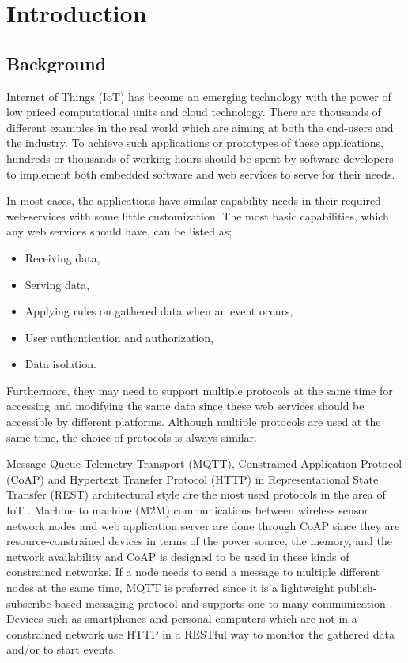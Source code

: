 
\chapter{Introduction}\label{chapter:introduction}

\section{Background}
Internet of Things (IoT) has become an emerging technology with the power of low priced computational units and cloud technology. There are thousands of different examples in the real world which are aiming at both the end-users and the industry. To achieve such applications or prototypes of these applications, hundreds or thousands of working hours should be spent by software developers to implement both embedded software and web services to serve for their needs. 

In most cases, the applications have similar capability needs in their required web-services with some little customization. The most basic capabilities, which any web services should have, can be listed as;
\begin{itemize}
  \item Receiving data,
  \item Serving data,
  \item Applying rules on gathered data when an event occurs,
  \item User authentication and authorization,
  \item Data isolation.
\end{itemize}
 Furthermore, they may need to support multiple protocols at the same time for accessing and modifying the same data since these web services should be accessible by different platforms. Although multiple protocols are used at the same time, the choice of protocols is always similar. 

 Message Queue Telemetry Transport (MQTT), Constrained Application Protocol (CoAP) and Hypertext Transfer Protocol (HTTP) in Representational State Transfer (REST) architectural style are the most used protocols in the area of IoT \cite{8246418,8070130}. Machine to machine (M2M) communications between wireless sensor network nodes and web application server are done through CoAP since they are resource-constrained devices in terms of the power source, the memory, and the network availability and CoAP is designed to be used in these kinds of constrained networks. If a node needs to send a message to multiple different nodes at the same time, MQTT is preferred since it is a lightweight publish-subscribe based messaging protocol and supports one-to-many communication \cite{mqtt}. Devices such as smartphones and personal computers which are not in a constrained network use HTTP in a RESTful way to monitor the gathered data and/or to start events.

